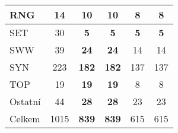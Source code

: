 \begin{longtable}{l|c|c|c|c|c}
\hline
{\footnotesize RNG} & {\footnotesize 14} & \textbf{10} & \textbf{10} & {\footnotesize 8} & {\footnotesize 8}\\
\hline
{\footnotesize SET} & {\footnotesize 30} & \textbf{5} & \textbf{5} & \textbf{5} & \textbf{5}\\
\hline
{\footnotesize SWW} & {\footnotesize 39} & \textbf{24} & \textbf{24} & {\footnotesize 14} & {\footnotesize 14}\\
\hline
{\footnotesize SYN} & {\footnotesize 223} & \textbf{182} & \textbf{182} & {\footnotesize 137} & {\footnotesize 137}\\
\hline
{\footnotesize TOP} & {\footnotesize 19} & \textbf{19} & \textbf{19} & {\footnotesize 8} & {\footnotesize 8}\\
\hline
{\footnotesize Ostatní} & {\footnotesize 44} & \textbf{28} & \textbf{28} & {\footnotesize 23} & {\footnotesize 23}\\
\hline
\hline
{\footnotesize Celkem} & {\footnotesize 1015} & \textbf{839} & \textbf{839} & {\footnotesize 615} & {\footnotesize 615}\\
\hline
\end{longtable}
